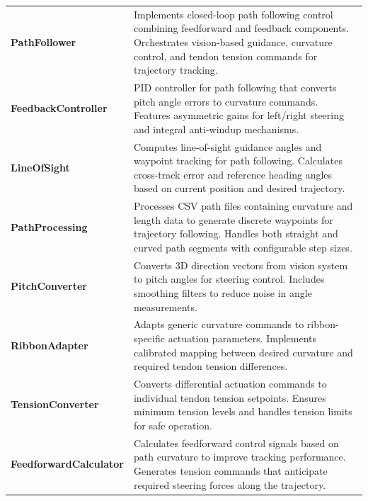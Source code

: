 \begin{longtable}{|>{\raggedright\arraybackslash}p{}|>{\raggedright\arraybackslash}p{}|}
\rowcolor{folderblue}
\multicolumn{2}{|c|}{\textcolor{white}{\textbf{\large  Path Following (pathfollowing/)}}} \\
\midrule
\cellcolor{lightblue}\textbf{PathFollower} & Implements closed-loop path following control combining feedforward and feedback components. Orchestrates vision-based guidance, curvature control, and tendon tension commands for trajectory tracking. \\
\hline
\cellcolor{lightblue}\textbf{FeedbackController} & PID controller for path following that converts pitch angle errors to curvature commands. Features asymmetric gains for left/right steering and integral anti-windup mechanisms. \\
\hline
\cellcolor{lightblue}\textbf{LineOfSight} & Computes line-of-sight guidance angles and waypoint tracking for path following. Calculates cross-track error and reference heading angles based on current position and desired trajectory. \\
\hline
\cellcolor{lightblue}\textbf{PathProcessing} & Processes CSV path files containing curvature and length data to generate discrete waypoints for trajectory following. Handles both straight and curved path segments with configurable step sizes. \\
\hline
\cellcolor{lightblue}\textbf{PitchConverter} & Converts 3D direction vectors from vision system to pitch angles for steering control. Includes smoothing filters to reduce noise in angle measurements. \\
\hline
\cellcolor{lightblue}\textbf{RibbonAdapter} & Adapts generic curvature commands to ribbon-specific actuation parameters. Implements calibrated mapping between desired curvature and required tendon tension differences. \\
\hline
\cellcolor{lightblue}\textbf{TensionConverter} & Converts differential actuation commands to individual tendon tension setpoints. Ensures minimum tension levels and handles tension limits for safe operation. \\
\hline
\cellcolor{lightblue}\textbf{FeedforwardCalculator} & Calculates feedforward control signals based on path curvature to improve tracking performance. Generates tension commands that anticipate required steering forces along the trajectory. \\

\end{longtable}
\newpage


